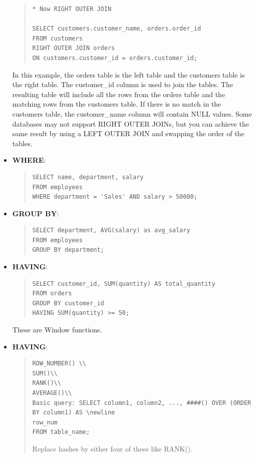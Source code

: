 \documentclass[11pt]{article}
\begin{document}
\begin{itemize}
\begin{quote}
\begin{verbatim}
* Now RIGHT OUTER JOIN

SELECT customers.customer_name, orders.order_id
FROM customers
RIGHT OUTER JOIN orders
ON customers.customer_id = orders.customer_id;
\end{verbatim}
\end{quote}
In this example, the orders table is the left table and the customers table is the right table. The customer\_id column is used to join the tables. The resulting table will include all the rows from the orders table and the matching rows from the customers table. If there is no match in the customers table, the customer\_name column will contain NULL values. Some databases may not support RIGHT OUTER JOINs, but you can achieve the same result by using a LEFT OUTER JOIN and swapping the order of the tables.


\item \textbf{WHERE}: 
\begin{quote}
\begin{verbatim}
SELECT name, department, salary
FROM employees
WHERE department = 'Sales' AND salary > 50000;
\end{verbatim}
\end{quote}



\item \textbf{GROUP BY}: 
\begin{quote}
\begin{verbatim}
SELECT department, AVG(salary) as avg_salary
FROM employees
GROUP BY department;
\end{verbatim}
\end{quote}


\item \textbf{HAVING}: 
\begin{quote}
\begin{verbatim}
SELECT customer_id, SUM(quantity) AS total_quantity
FROM orders
GROUP BY customer_id
HAVING SUM(quantity) >= 50;
\end{verbatim}
\end{quote}


These are Window functions. 
\item \textbf{HAVING}: 
\begin{quote}
\begin{verbatim}
ROW_NUMBER() \\
SUM()\\
RANK()\\
AVERAGE()\\
Basic query: SELECT column1, column2, ..., ####() OVER (ORDER BY column1) AS \newline
row_num
FROM table_name;
\end{verbatim}
Replace hashes by either four of these like RANK(). 
\end{quote}



\end{itemize}
\end{document}
